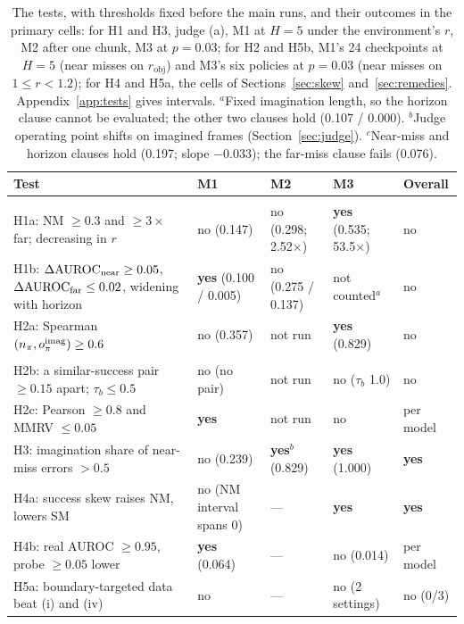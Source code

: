 \documentclass[10pt]{article}
\newcommand{\rob}{r_{\mathrm{obj}}}
\newcommand{\dauc}{\Delta\mathrm{AUROC}}
\newcommand{\yes}{\textbf{yes}}
\begin{document}
\begin{table}[t]
\caption{The tests, with thresholds fixed before the main runs, and their outcomes in the primary cells: for H1 and H3, judge (a), M1 at $H=5$ under the environment's $r$, M2 after one chunk, M3 at $p=0.03$; for H2 and H5b, M1's 24 checkpoints at $H=5$ (near misses on $\rob$) and M3's six policies at $p=0.03$ (near misses on $1\le r<1.2$); for H4 and H5a, the cells of Sections~\ref{sec:skew} and~\ref{sec:remedies}. Appendix~\ref{app:tests} gives intervals. $^a$Fixed imagination length, so the horizon clause cannot be evaluated; the other two clauses hold (0.107 / 0.000). $^b$Judge operating point shifts on imagined frames (Section~\ref{sec:judge}). $^c$Near-miss and horizon clauses hold (0.197; slope $-0.033$); the far-miss clause fails (0.076).}
\label{tab:tests}
\centering\footnotesize
\setlength{\tabcolsep}{3.5pt}
\begin{tabular}{>{\raggedright}p{5.5cm}>{\raggedright}p{2.35cm}>{\raggedright}p{2.35cm}>{\raggedright}p{2.35cm}>{\raggedright\arraybackslash}p{1.45cm}}
\toprule
Test & M1 & M2 & M3 & Overall \\
\midrule
\multicolumn{5}{l}{\emph{Primary tests (multiplicity-corrected)}} \\
H1a: NM $\ge0.3$ and $\ge3\times$ far; decreasing in $r$ & no (0.147) & no (0.298; 2.52$\times$) & \yes{} (0.535; 53.5$\times$) & no \\
H1b: $\dauc_{\rm near}\ge0.05$, $\dauc_{\rm far}\le0.02$, widening with horizon & \yes{} (0.100 / 0.005) & no (0.275 / 0.137) & not counted$^a$ & no \\
H2a: Spearman$(n_\pi,o^{\rm imag}_\pi)\ge0.6$ & no (0.357) & not run & \yes{} (0.829) & no \\
\midrule
\multicolumn{5}{l}{\emph{Other tests}} \\
H2b: a similar-success pair $\ge0.15$ apart; $\tau_b\le0.5$ & no (no pair) & not run & no ($\tau_b$ 1.0) & no \\
H2c: Pearson $\ge0.8$ and MMRV $\le0.05$ & \yes{} & not run & no & per model \\
H3: imagination share of near-miss errors $>0.5$ & no (0.239) & \yes$^b$ (0.829) & \yes{} (1.000) & \yes{} \\
H4a: success skew raises NM, lowers SM & no (NM interval spans 0) & --- & \yes{} & \yes{} \\
H4b: real AUROC $\ge0.95$, probe $\ge0.05$ lower & \yes{} (0.064) & --- & no (0.014) & per model \\
H5a: boundary-targeted data beat (i) and (iv) & no & --- & no (2 settings) & no (0/3) \\

\end{tabular}
\end{table}
\end{document}
